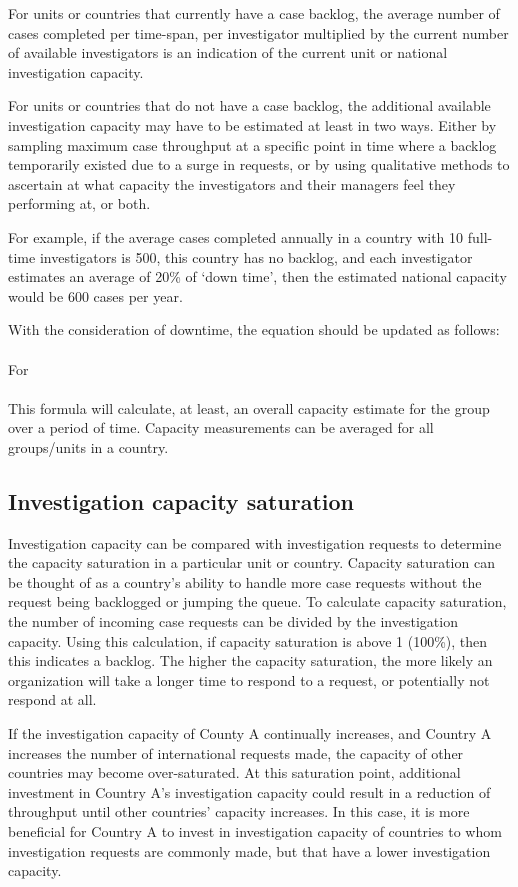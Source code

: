 \documentclass[10pt,a4paper]{article}
\begin{document}
For units or countries that currently have a case backlog, the average number of cases completed per time-span, per investigator multiplied by the current number of available investigators is an indication of the current unit or national investigation capacity.

For units or countries that do not have a case backlog, the additional available investigation capacity may have to be estimated at least in two ways. Either by sampling maximum case throughput at a specific point in time where a backlog temporarily existed due to a surge in requests, or by using qualitative methods to ascertain at what capacity the investigators and their managers feel they performing at, or both.

For example, if the average cases completed annually in a country with 10 full-time investigators is 500, this country has no backlog, and each investigator estimates an average of 20\% of `down time', then the estimated national capacity would be 600 cases per year. 

With the consideration of downtime, the equation  should be updated as follows:
\\
\\
For 
\\
\\
This formula will calculate, at least, an overall capacity estimate for the group over a period of time. Capacity measurements can be averaged for all groups/units in a country.

\subsection{Investigation capacity saturation}
Investigation capacity can be compared with investigation requests to determine the capacity saturation in a particular unit or country. Capacity saturation can be thought of as a country's ability to handle more case requests without the request being backlogged or jumping the queue. To calculate capacity saturation, the number of incoming case requests can be divided by the investigation capacity. Using this calculation, if capacity saturation is above 1 (100\%), then this indicates a backlog. The higher the capacity saturation, the more likely an organization will take a longer time to respond to a request, or potentially not respond at all.

If the investigation capacity of County A continually increases, and Country A increases the number of international requests made, the capacity of other countries may become over-saturated. At this saturation point, additional investment in Country A's investigation capacity could result in a reduction of throughput until other countries' capacity increases. In this case, it is more beneficial for Country A to invest in investigation capacity of countries to whom investigation requests are commonly made, but that have a lower investigation capacity.
\end{document}
